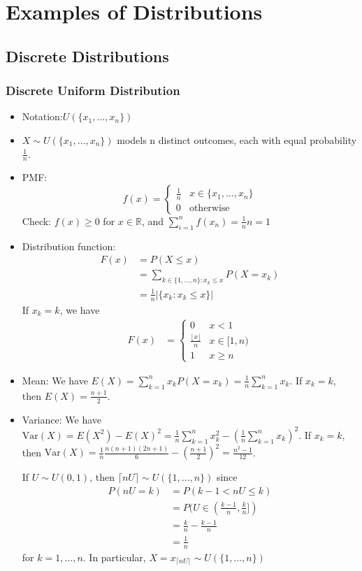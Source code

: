 \documentclass{article}
\newcommand{\R}{\mathbb{R}}
\newcommand{\Var}{\mathrm{Var}}
\begin{document}
		\section{Examples of Distributions}
		\subsection{Discrete Distributions}
		\subsubsection{Discrete Uniform Distribution}
		\begin{itemize}
			\item Notation:$U(\{x_1, \dots, x_n\})$
			\item $X\sim U(\{x_1, \dots, x_n\})$ models n distinct outcomes, each with equal probability $\frac{1}{n}$.
			\item PMF: \[f(x)=
						\begin{cases}
							\frac{1}{n}&x\in\{x_1, \dots, x_n\}\\
							0&\mbox{otherwise}
						\end{cases}\]
			Check: $f(x)\geq0$ for $x\in\R$, and $\sum_{i=1}^{n}f(x_n)=\frac{1}{n}n=1$
			
			\item Distribution function:
			\begin{align*}
				F(x)&=P(X\leq x)\\
				&=\sum_{k\in\{1, \dots, n\} : x_k\leq x}P(X=x_k)\\
				&=\frac{1}{n}|\{x_k : x_k\leq x\}|
			\end{align*}
			If $x_k=k$, we have
			\begin{align*}
				F(x)&=\begin{cases}
					0&x<1\\
					\frac{\lfloor x\rfloor}{n}&x\in[1, n)\\
					1&x\geq n
				\end{cases}
			\end{align*}
			\item Mean: We have $E(X)=\sum_{k=1}^{n}x_kP(X=x_k)=\frac{1}{n}\sum_{k=1}^{n}x_k$. If $x_k=k$, then $E(X)=\frac{n+1}{2}$.
			\item Variance: We have $\Var(X)=E(X^2)-E(X)^2=\frac{1}{n}\sum_{k=1}^{n}x_k^2-(\frac{1}{n}\sum_{k=1}^{n}x_k)^2$. If $x_k=k$, then $\Var(X)=\frac{1}{n}\frac{n(n+1)(2n+1)}{6}-(\frac{n+1}{2})^2=\frac{n^2-1}{12}$.
			\begin{myrem*}{}{}
				If $U\sim U(0, 1)$, then $\lceil nU\rceil\sim U(\{1, \dots, n\})$ since
				\begin{align*}
					P(nU=k)&=P(k-1<nU\leq k)\\
					&=P(U\in(\frac{k-1}{n}, \frac{k}{n}])\\
					&=\frac{k}{n}-\frac{k-1}{n}\\
					&=\frac{1}{n}
				\end{align*}
				for $k=1, \dots, n$. In particular, $X=x_{\lceil nU\rceil}\sim U(\{1, \dots, n\})$
			\end{myrem*}
		\end{itemize}
		
\end{document}
